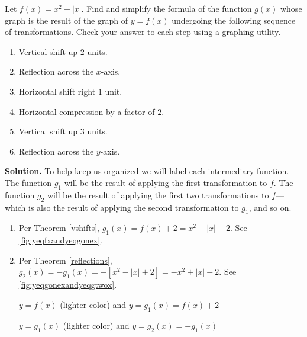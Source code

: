 \begin{ex}  \label{graphingcalctrans} Let $f(x) = x^2 - |x|$.  Find and simplify the formula of the function $g(x)$ whose graph is the result of the graph of $y=f(x)$ undergoing the following sequence of transformations. Check your answer to each step using a graphing utility.

\begin{enumerate}
\item  Vertical shift up $2$ units.
\item  Reflection across the $x$-axis.
\item  Horizontal shift right $1$ unit.
\item  Horizontal compression by a factor of $2$.
\item  Vertical shift up $3$ units.
\item  Reflection across the $y$-axis.
\end{enumerate}

{\bf Solution.}  To help keep us organized we will label each intermediary function.  The function $g_{1}$ will be the result of applying the first transformation to $f$.  The function $g_{2}$ will be the result of applying the first two transformations to $f$---which is also the result of applying the second transformation to $g_{1}$, and so on.

\begin{enumerate}

\item  Per Theorem \ref{vshifts}, $g_{1}(x) = f(x) + 2 = x^2-|x|+2$. See \autoref{fig:yeqfxandyeqgonex}.

\item  Per Theorem \ref{reflections}, $g_{2}(x) = -g_{1}(x) =  -[x^2-|x|+2] = -x^2+|x|-2$. See \autoref{fig:yeqgonexandyeqgtwox}.

\begin{mfigure}


\caption{$y=f(x)$ (lighter color) and $y=g_{1}(x) = f(x)+2$}
\label{fig:yeqfxandyeqgonex}
\end{mfigure}

\begin{mfigure}


\caption{$y = g_{1}(x)$ (lighter color) and $y = g_{2}(x) = -g_{1}(x)$}
\label{fig:yeqgonexandyeqgtwox}
\end{mfigure}


\end{enumerate}
\end{ex}
